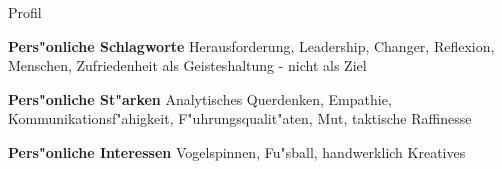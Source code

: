 \begin{rubric}{Profil}

\entry* \textbf{Pers"onliche Schlagworte}\newline 
Herausforderung, Leadership, Changer, Reflexion, Menschen, Zufriedenheit als Geisteshaltung - nicht als Ziel

\entry* \textbf{Pers"onliche St"arken}\newline 
Analytisches Querdenken, Empathie, Kommunikationsf"ahigkeit, F"uhrungsqualit"aten, Mut, taktische Raffinesse

\entry* \textbf{Pers"onliche Interessen}\newline  
Vogelspinnen, Fu"sball, handwerklich Kreatives

\end{rubric}
